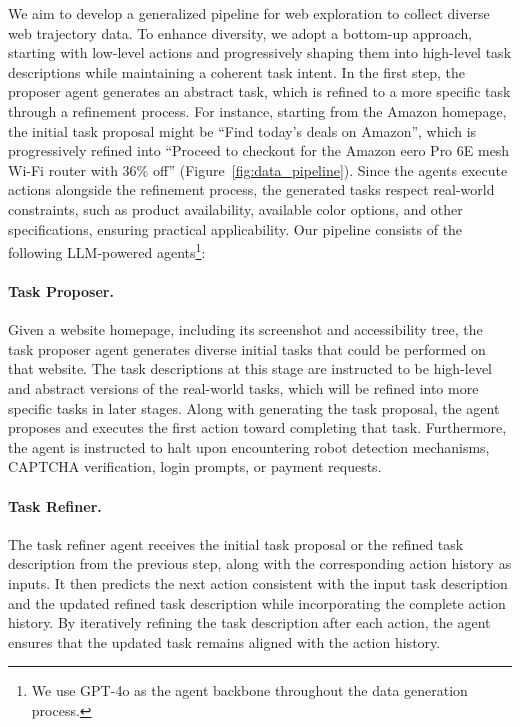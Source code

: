 We aim to develop a generalized pipeline for web exploration to collect diverse web trajectory data.
To enhance diversity, we adopt a bottom-up approach, starting with low-level actions and progressively shaping them into high-level task descriptions while maintaining a coherent task intent.
In the first step, the proposer agent generates an abstract task, which is refined to a more specific task through a refinement process.
For instance, starting from the Amazon homepage, the initial task proposal might be ``Find today’s deals on Amazon'', which is progressively refined into ``Proceed to checkout for the Amazon eero Pro 6E mesh Wi-Fi router with 36\% off'' (Figure~\ref{fig:data_pipeline}).
Since the agents execute actions alongside the refinement process, the generated tasks respect real-world constraints, such as product availability, available color options, and other specifications, ensuring practical applicability.
Our pipeline consists of the following LLM-powered agents\footnote{We use GPT-4o as the agent backbone throughout the data generation process.}:

\paragraph{Task Proposer.}
Given a website homepage, including its screenshot and accessibility tree, the task proposer agent generates diverse initial tasks that could be performed on that website.
The task descriptions at this stage are instructed to be high-level and abstract versions of the real-world tasks, which will be refined into more specific tasks in later stages.
Along with generating the task proposal, the agent proposes and executes the first action toward completing that task.
Furthermore, the agent is instructed to halt upon encountering robot detection mechanisms, CAPTCHA verification, login prompts, or payment requests.



\paragraph{Task Refiner.}
The task refiner agent receives the initial task proposal or the refined task description from the previous step, along with the corresponding action history as inputs.
It then predicts the next action consistent with the input task description and the updated refined task description 
while incorporating the complete action history.
By iteratively refining the task description after each action, the agent ensures that the updated task remains aligned with the action history.

